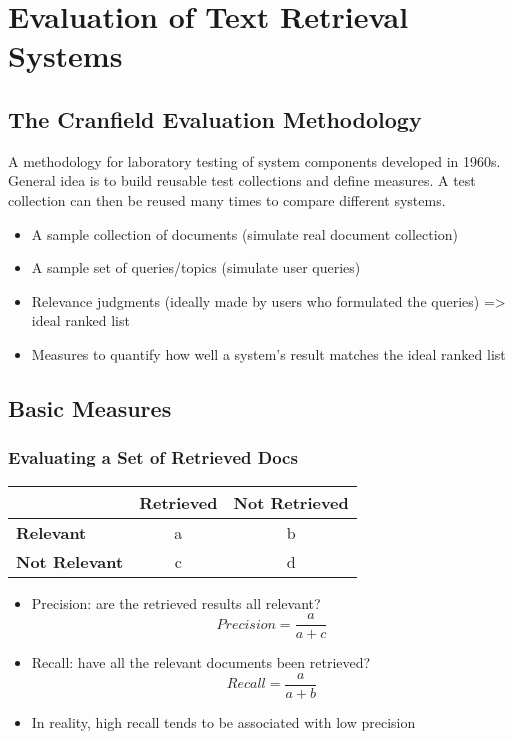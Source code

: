 \newpage
\section{Evaluation of Text Retrieval Systems}

\subsection{The Cranfield Evaluation Methodology}

A methodology for laboratory testing of system components developed in 1960s. General idea is to build reusable test collections and define measures. A test collection can then be reused many times to compare different systems.
\begin{itemize}
\item A sample collection of documents (simulate real document collection)
\item A sample set of queries/topics (simulate user queries)
\item Relevance judgments (ideally made by users who formulated the queries) => ideal ranked list
\item  Measures to quantify how well a system’s result matches the ideal ranked list
\end{itemize}


\subsection{Basic Measures}
\subsubsection{Evaluating a Set of Retrieved Docs}

\begin{center}
  \begin{tabular}{ | l | c | c | }
    \hline
    & \textbf{Retrieved} & \textbf{Not Retrieved} \\    
    \hline    
    \textbf{Relevant}     & a & b \\
    \textbf{Not Relevant} & c & d \\
    \hline  
  \end{tabular}
\end{center}

\begin{itemize}
\item Precision: are the retrieved results all relevant?
\begin{equation*}
Precision = \frac{a}{a+c}
\end{equation*}
\item Recall: have all the relevant documents been retrieved?
\begin{equation*}
Recall = \frac{a}{a+b}
\end{equation*}
\item In reality, high recall tends to be associated with low precision
\end{itemize}


